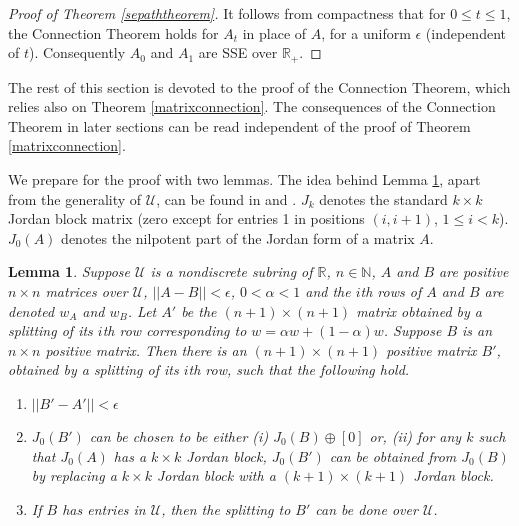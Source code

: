 \documentclass{amsart}
\newtheorem{lemma}[theorem]{Lemma}
\theoremstyle{definition}
\theoremstyle{remark}
\numberwithin{equation}{section}
\begin{document}
{{\begin{proof}[Proof of Theorem \ref{sepaththeorem}] 
It follows from compactness that for $0\leq t\leq 1$, the Connection 
Theorem 
holds for $A_t$ in place of $A$, for a uniform $\epsilon $ 
(independent of $t$). Consequently $A_0$ and $A_1$ are SSE over $\mathbb R_+$. 
\end{proof} 

 
The rest of this section is devoted to 
the proof of the Connection Theorem, which relies also on 
Theorem \ref{matrixconnection}.  The consequences of the Connection Theorem 
in later sections can be read independent of the proof of 
Theorem \ref{matrixconnection}. 
 
We  prepare for the proof with two lemmas. 
The idea behind Lemma \ref{jordanlemma}, apart from the 
generality of $\mathcal U$, 
can be found in \cite{KR5} and \cite[Lemma 1]{KR2}.
 $J_k$ denotes the standard  $k\times k$ Jordan block  matrix 
(zero except for entries 1 in positions $(i,i+1)$, $1\leq i < k$). 
$J_0(A)$ denotes the nilpotent part of the Jordan form of a matrix $A$.

\begin{lemma} \label{jordanlemma} 
Suppose $\mathcal U$ is a nondiscrete subring of $\mathbb R$, 
$n\in \mathbb N$, $A$ and $B$ are positive $n\times n$ 
matrices over $\mathcal U$, $||A-B||<\epsilon$, 
$0<\alpha < 1$ and the $i$th rows of $A$ and $B$ are denoted 
$w_A$ and $w_B$. 
Let $A'$ be the 
 $(n+1)\times (n+1)$ matrix obtained by a splitting 
of its $i$th row corresponding 
to $w = \alpha w + (1-\alpha )w$. Suppose $B$ is an $n\times n$ 
positive matrix. 
Then there is an $(n+1)\times (n+1)$ positive matrix $B'$, 
obtained by a splitting of its $i$th row,
 such that 
the following hold. 
\begin{enumerate} 
\item 
$||B'-A'|| <  \epsilon $ 
\item 
 $J_0(B')$ can be chosen to be either 
(i) $J_0(B) \oplus [0]$ or, (ii) for 
any $k$ such that $J_0(A) $ has a $k\times k$ Jordan block, 
$J_0(B')$ can be obtained  
from $J_0(B) $ by replacing a 
$k\times k$ Jordan block 
with a $(k+1)\times (k+1)$ Jordan block. 
\item 
If $B$ has entries in $\mathcal U$, then 
the splitting to $B'$ can be done over $\mathcal U$. 
\end{enumerate} 
\end{lemma} 

}}
\end{document}

